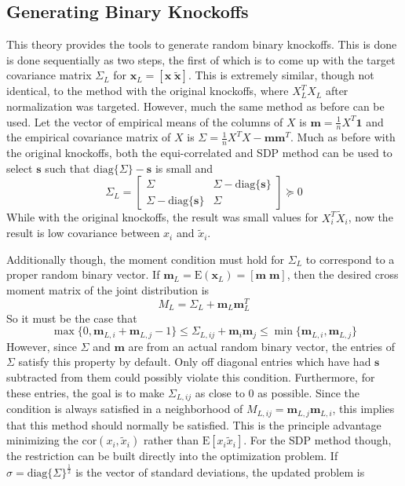 \documentclass[11pt]{article}
\newcommand{\E}{\mathrm{E}}
\newcommand{\diag}[1]{\mathrm{diag}\{#1\}}
\theoremstyle{definition}
\begin{document}
\subsection{Generating Binary Knockoffs}
This theory provides the tools to generate random binary knockoffs. This is done is done sequentially as two steps, the first of which is to come up with the target covariance matrix $\Sigma_L$ for $\mathbf x_L = [\mathbf x\; \mathbf{\tilde x}]$. This is extremely similar, though not identical, to the method with the original knockoffs, where $X_L^TX_L$ after normalization was targeted. However, much the same method as before can be used. Let the vector of empirical means of the columns of $X$ is $\mathbf m = \frac{1}{n}X^T\mathbf 1$ and the empirical covariance matrix of $X$ is $\Sigma = \frac{1}{n}X^TX - \mathbf{m}\mathbf{m}^T$. Much as before with the original knockoffs, both the equi-correlated and SDP method can be used to select  $\mathbf s$  such that $\diag{\Sigma}-\mathbf s$ is small and 
        \[ \Sigma_L = \left[\begin{array}{cc}  \Sigma & \Sigma - \diag{\mathbf s }\\ \Sigma - \diag{\mathbf s} & \Sigma \end{array}\right] \succeq 0 \]
    While with the original knockoffs, the result was small values for $X_i^T\tilde X_i$, now the result is low covariance between $x_i$ and $\tilde x_i$.\par
    Additionally though, the moment condition must hold for $\Sigma_L$ to correspond to a proper random binary vector. If $\mathbf m_L = \E\left(\mathbf x_L\right) = [\mathbf m \; \mathbf m]$, then the desired cross moment matrix of the joint distribution is 
        \[ M_L = \Sigma_L + \mathbf m_L\mathbf m_L^T\]
        So it must be the case that  
        \[\max\{0,\mathbf m_{L,i} + \mathbf m_{L,j} -1\} \leq \Sigma_{L,ij} + \mathbf m_i \mathbf m_j \leq \min\{\mathbf m_{L,i}, \mathbf m_{L,j}\} \]
        However, since $\Sigma$ and $\mathbf m$ are from an actual random binary vector, the entries of $\Sigma$ satisfy this property by default. Only off diagonal entries which have had $\mathbf s$ subtracted from them could possibly violate this condition. Furthermore, for these entries, the goal is to make $\Sigma_{L,ij}$ as close to $0$ as possible. Since the condition is always satisfied in a neighborhood of $M_{L,ij} = \mathbf m_{L,j}\mathbf m_{L,i}$, this implies that this method should normally be satisfied. This is the principle advantage minimizing the $\textrm{cor}(x_i,\tilde x_i)$ rather than $\E[x_i\tilde x_i]$. For the SDP method though, the restriction can be built directly into the optimization problem. If $\sigma = \diag{\Sigma}^{\frac{1}{2}}$ is the vector of standard deviations, the updated problem is
\end{document}
